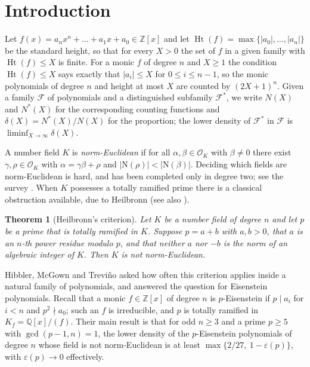 \documentclass[11pt,reqno]{amsart}
\theoremstyle{plain}
\newtheorem{theorem}{Theorem}[section]
\theoremstyle{definition}
\theoremstyle{remark}
\newcommand{\Z}{\mathbb{Z}}
\newcommand{\Q}{\mathbb{Q}}
\newcommand{\OK}{\mathcal{O}_K}
\newcommand{\Ht}{\operatorname{Ht}}
\newcommand{\N}{\mathrm{N}}
\begin{document}
\section{Introduction}

Let $f(x)=a_nx^n+\dots+a_1x+a_0 \in \Z[x]$ and let
$\Ht(f)=\max\{|a_0|,\dots,|a_n|\}$ be the standard height, so that for every $X>0$ the set of
$f$ in a given family with $\Ht(f)\le X$ is finite. For a monic $f$ of degree $n$ and $X\ge1$ the
condition $\Ht(f)\le X$ says exactly that $|a_i|\le X$ for $0\le i\le n-1$, so the monic
polynomials of degree $n$ and height at most $X$ are counted by $(2X+1)^n$. Given a family $\mathcal F$ of polynomials and
a distinguished subfamily $\mathcal F^*$, we write $N(X)$ and $N^*(X)$ for the corresponding
counting functions and $\delta(X)=N^*(X)/N(X)$ for the proportion; the lower density of
$\mathcal F^*$ in $\mathcal F$ is $\liminf_{X\to\infty}\delta(X)$.

A number field $K$ is \emph{norm-Euclidean} if for all $\alpha,\beta\in\OK$ with $\beta\ne 0$
there exist $\gamma,\rho\in\OK$ with $\alpha=\gamma\beta+\rho$ and $|\N(\rho)|<|\N(\beta)|$.
Deciding which fields are norm-Euclidean is hard, and has been completed only in degree two; see
the survey \cite{Lemmermeyer}. When $K$ possesses a totally ramified prime there is a classical
obstruction available, due to Heilbronn \cite{H1,H2} (see also \cite{EK,Egami}).

\begin{theorem}[Heilbronn's criterion]\label{thm:heilbronn-intro}
Let $K$ be a number field of degree $n$ and let $p$ be a prime that is totally ramified in $K$.
Suppose $p=a+b$ with $a,b>0$, that $a$ is an $n$-th power residue modulo $p$, and that neither
$a$ nor $-b$ is the norm of an algebraic integer of $K$. Then $K$ is not norm-Euclidean.
\end{theorem}

Hibbler, McGown and Trevi\~no \cite{HMT} asked how often this criterion applies inside a natural
family of polynomials, and answered the question for Eisenstein polynomials. Recall that a monic
$f\in\Z[x]$ of degree $n$ is $p$-Eisenstein if $p \mid a_i$ for $i<n$ and $p^2 \nmid a_0$; such an
$f$ is irreducible, and $p$ is totally ramified in $K_f=\Q[x]/(f)$. Their main result is that for
odd $n\ge 3$ and a prime $p\ge5$ with $\gcd(p-1,n)=1$, the lower density of the $p$-Eisenstein
polynomials of degree $n$ whose field is not norm-Euclidean is at least
$\max\{2/27,\ 1-\varepsilon(p)\}$, with $\varepsilon(p)\to0$ effectively.
\end{document}
